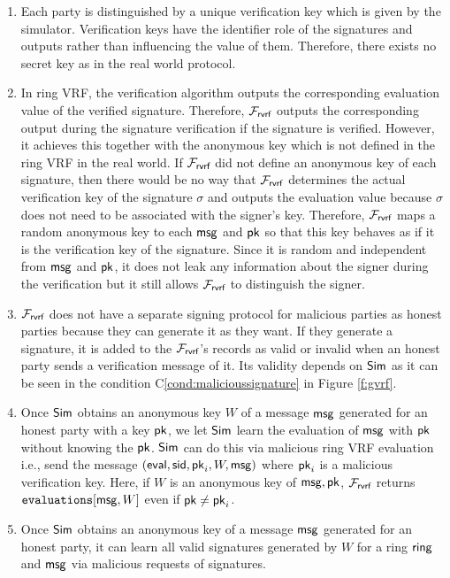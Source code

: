 \begin{enumerate}[label={{R-} }{{\arabic*}}, start = 1]
	\item Each party is distinguished by a unique verification key which is given by the simulator. Verification keys have the identifier role of  the signatures and outputs rather than  influencing the value of them. Therefore, there exists no secret key as in the real world protocol. 
	
	\item In ring VRF, the verification algorithm outputs the corresponding evaluation value of the verified signature. Therefore, $ \mathcal{F}_{\textsf{rvrf}} $  outputs the corresponding output during the signature verification if the signature is verified. However, it achieves this together with the anonymous key which is not defined in the ring VRF in the real world.  If $ \mathcal{F}_{\textsf{rvrf}} $ did not define an anonymous key of each signature, then there would be no way that $ \mathcal{F}_{\textsf{rvrf}} $ determines the actual verification key of the signature $ \sigma $ and outputs the evaluation value because $ \sigma $ does not need to be associated with the signer's key. Therefore, $ \mathcal{F}_{\textsf{rvrf}} $ maps a random anonymous key to each $ \mathsf{msg} $ and $ \mathsf{pk} $ so that this key behaves as if it is the verification key of the signature. Since it  is  random and independent from $ \mathsf{msg} $ and $ \mathsf{pk} $, it does not leak any information about the signer during the verification but it still allows $ \mathcal{F}_{\textsf{rvrf}} $ to distinguish the signer.
	
	\item $ \mathcal{F}_{\textsf{rvrf}} $ does not have a separate signing protocol for malicious parties as honest parties because they can generate it as they want. If they generate a signature, it is added to the $ \mathcal{F}_{\textsf{rvrf}} $'s records as valid or invalid when an honest party sends a verification message of it.  Its validity depends on $ \mathsf{Sim} $ as it can be seen in  the condition C\ref{cond:malicioussignature} in Figure \ref{f:gvrf}. 
	
	\item Once $ \mathsf{Sim} $ obtains an anonymous key $ W $ of a message $ \mathsf{msg} $ generated for an honest party with a key $ \mathsf{pk} $, we let $ \mathsf{Sim} $ learn the  evaluation of  $ \mathsf{msg} $ with $ \mathsf{pk} $ without knowing the $ \mathsf{pk} $. $ \mathsf{Sim} $ can do this via malicious ring VRF evaluation i.e., send the message $ (\mathsf{eval}, \textsf{sid}, \mathsf{pk}_i,W,\mathsf{msg}) $ where $ \mathsf{pk}_i $ is a malicious verification key. Here, if $ W $ is an anonymous key of $ \mathsf{msg}, \mathsf{pk}  $, $ \mathcal{F}_{\textsf{rvrf}} $ returns $ \texttt{evaluations}[\mathsf{msg}, W] $ even if $ \mathsf{pk} \neq \mathsf{pk}_i $. 
	
	\item Once $ \mathsf{Sim} $ obtains an anonymous key of a message $ \mathsf{msg} $ generated for an honest party, it can learn all valid signatures generated by $ W $ for a ring $ \mathsf{ring} $ and $ \mathsf{msg} $ via malicious requests of signatures.
	
\end{enumerate}
